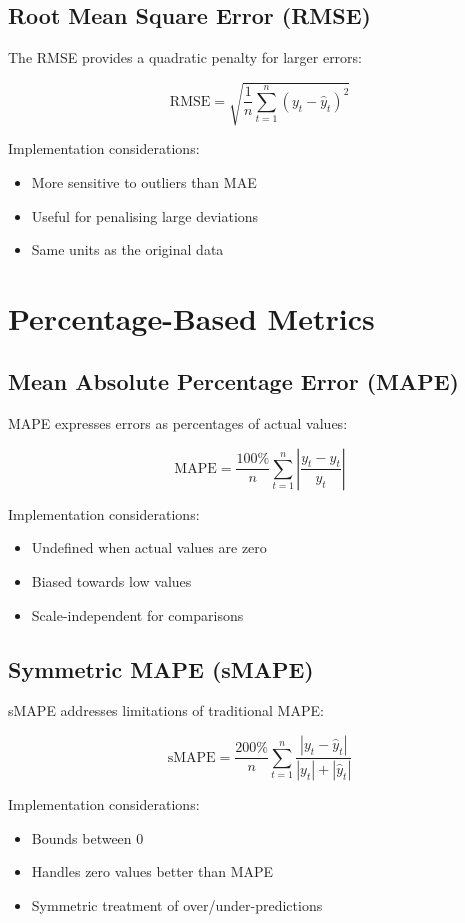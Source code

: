 \documentclass[12pt,a4paper]{report}
\begin{document}
\subsection{Root Mean Square Error (RMSE)}
The RMSE provides a quadratic penalty for larger errors:

\[
\text{RMSE} = \sqrt{\frac{1}{n} \sum_{t=1}^{n} (y_t - \hat{y}_t)^2}
\]

Implementation considerations:
\begin{itemize}
    \item More sensitive to outliers than MAE
    \item Useful for penalising large deviations
    \item Same units as the original data
\end{itemize}

\section{Percentage-Based Metrics}

\subsection{Mean Absolute Percentage Error (MAPE)}
MAPE expresses errors as percentages of actual values:

\[
\text{MAPE} = \frac{100\%}{n} \sum_{t=1}^{n} \left|\frac{y_t - \hat{y}_t}{y_t}\right|
\]

Implementation considerations:
\begin{itemize}
    \item Undefined when actual values are zero
    \item Biased towards low values
    \item Scale-independent for comparisons
\end{itemize}

\subsection{Symmetric MAPE (sMAPE)}
sMAPE addresses limitations of traditional MAPE:

\[
\text{sMAPE} = \frac{200\%}{n} \sum_{t=1}^{n} \frac{|y_t - \hat{y}_t|}{|y_t| + |\hat{y}_t|}
\]

Implementation considerations:
\begin{itemize}
    \item Bounds between 0%
    \item Handles zero values better than MAPE
    \item Symmetric treatment of over/under-predictions
\end{itemize}
\end{document}
